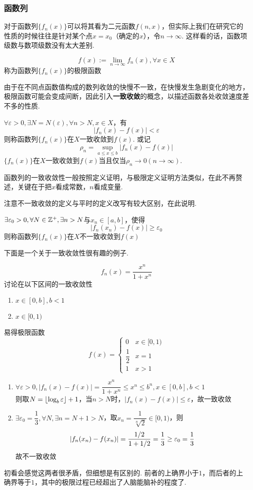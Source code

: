 \subsubsection{函数列}
对于函数列$\{f_n(x)\}$可以将其看为二元函数$f(n,x)$，但实际上我们在研究它的性质的时候往往是针对某个点$x=x_0$（确定的$x$），令$n\to\infty$. 这样看的话，函数项级数与数项级数没有太大差别.
\begin{definition}[极限函数]
\[f(x):=\lim_{n\to\infty}f_n(x),\forall x\in X\]
称为函数列$\{f_n(x)\}$的极限函数
\end{definition}
由于在不同点函数值构成的数列收敛的快慢不一致，在快慢发生急剧变化的地方，极限函数可能会变成间断，因此引入\textbf{一致收敛}的概念，以描述函数各处收敛速度差不多的性质.
\begin{definition}[一致收敛]
$\forall \varepsilon>0,\exists N=N(\varepsilon),\forall n>N, x\in X$，有
\[|f_n(x)-f(x)|<\varepsilon\]
则称函数列$\{f_n(x)\}$在$X$一致收敛到$f(x)$. 或记
\[\rho_n=\sup_{a\leq x\leq b}|f_n(x)-f(x)|\]
$\{f_n(x)\}$在$X$一致收敛到$f(x)$当且仅当$\rho_n\to0(n\to\infty)$.
\end{definition}
\par 函数列的一致收敛性一般按照定义证明，与极限定义证明方法类似，在此不再赘述，关键在于把$x$看成常数，$n$看成变量.
\par 注意不一致收敛的定义与平时的定义改写有较大区别，在此说明.
\begin{definition}[不一致收敛]
$\exists \varepsilon_0>0,\forall N\in\mathbb{Z}^+,\exists n>N$与$x_n\in[a,b]$，使得
\[|f_n(x_n)-f(x)|\geq\varepsilon_0\]
则称函数列$\{f_n(x)\}$在$X$不一致收敛到$f(x)$
\end{definition}
\par 下面是一个关于一致收敛性很有趣的例子.
\begin{example}
\label{ex:interesting_uniform_convergence}
\[f_n(x)=\dfrac{x^n}{1+x^n}\]
讨论在以下区间的一致收敛性
\begin{enumerate}
	\itemsep -3pt
	\item $x\in[0,b],b<1$
	\item $x\in[0,1)$
\end{enumerate}
\end{example}
\begin{analysis}易得极限函数
\[f(x)=\begin{cases}
0&x\in[0,1)\\
\dfrac{1}{2}&x=1\\
1&x>1
\end{cases}\]
\begin{enumerate}
	\item $\forall\varepsilon>0,|f_n(x)-f(x)|=\dfrac{x^n}{1+x^n}\leq x^n\leq b^n,x\in[0,b],b<1$\\
	则取$N=\lfloor\log_b\varepsilon\rfloor+1$，当$n>N$时，$|f_n(x)-f(x)|\leq \varepsilon$，故一致收敛
	\item $\exists\varepsilon_0=\dfrac{1}{3},\forall N,\exists n=N+1>N$，取$x_n=\dfrac{1}{\sqrt[n]{2}}\in[0,1)$，则
	\[|f_n(x_n)-f(x_n)|=\dfrac{1/2}{1+1/2}=\dfrac{1}{3}\geq\varepsilon_0=\dfrac{1}{3}\]
	故不一致收敛
\end{enumerate}
初看会感觉这两者很矛盾，但细想是有区别的. 前者的上确界小于$1$，而后者的上确界等于$1$，其中的极限过程已经超出了人脑能脑补的程度了.
\end{analysis}
